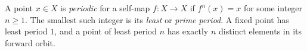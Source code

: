
A point $x\in X$ is \emph{periodic} for a self-map $f:X\to X$ if $f^n(x)=x$ for some integer $n\ge1$. The smallest such integer is its \emph{least} or \emph{prime period}. A fixed point has least period $1$, and a point of least period $n$ has exactly $n$ distinct elements in its forward orbit.
